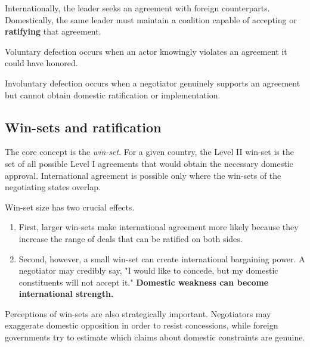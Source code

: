 Internationally, the leader seeks an agreement with foreign counterparts. Domestically, the same leader must maintain a coalition capable of accepting or \textbf{ratifying} that agreement.

Voluntary defection occurs when an actor knowingly violates an agreement it could have honored.

Involuntary defection occurs when a negotiator genuinely supports an agreement but cannot obtain domestic ratification or implementation.

\subsection{Win-sets and ratification}

The core concept is the \emph{win-set}. For a given country, the Level II win-set is the set of all possible Level I agreements that would obtain the necessary domestic approval. International agreement is possible only where the win-sets of the negotiating states overlap.

Win-set size has two crucial effects.

\begin{enumerate}
    \item First, larger win-sets make international agreement more likely because they increase the range of deals that can be ratified on both sides.
    \item Second, however, a small win-set can create international bargaining power. A negotiator may credibly say, "I would like to concede, but my domestic constituents will not accept it."
    \textbf{Domestic weakness can become international strength.}
\end{enumerate}

Perceptions of win-sets are also strategically important. Negotiators may exaggerate domestic opposition in order to resist concessions, while foreign governments try to estimate which claims about domestic constraints are genuine.

